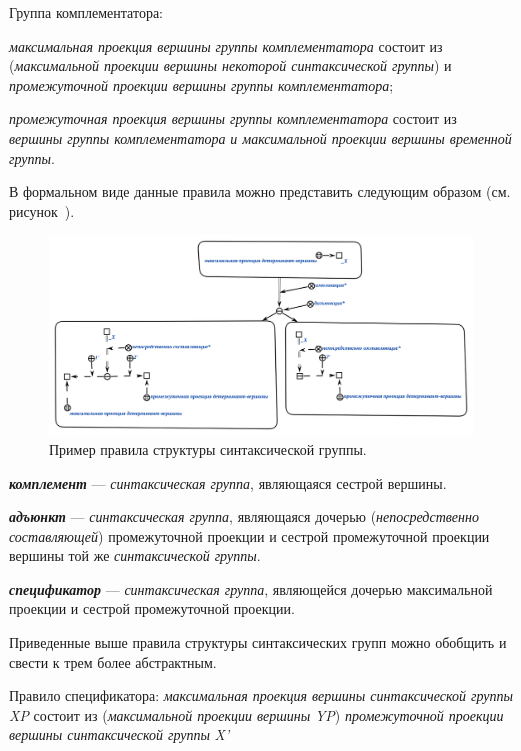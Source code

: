 Группа комплементатора:
\begin{textitemize}
    \item \textit{максимальная проекция вершины группы комплементатора} состоит из (\textit{максимальной проекции вершины некоторой синтаксической группы}) и \textit{промежуточной проекции вершины группы комплементатора};
    \item \textit{промежуточная проекция вершины группы комплементатора} состоит из \textit{вершины группы комплементатора} \textit{и максимальной проекции вершины временной группы}.
\end{textitemize}

В формальном виде данные правила можно представить следующим образом (см.
рисунок~\textit{}).

\begin{figure}[h]
    \centering
    \includegraphics[scale=0.8]{images/part2/chapter_lang/tree_structure_rule}
    \caption{Пример правила структуры синтаксической группы.}
    \label{fig:pic_tree_structure_rule}
\end{figure}

\textbf{\textit{комплемент}} --- \textit{синтаксическая группа}, являющаяся сестрой вершины.

\textbf{\textit{адъюнкт}} --- \textit{синтаксическая группа}, являющаяся дочерью (\textit{непосредственно составляющей}) промежуточной проекции и сестрой промежуточной проекции вершины той же \textit{синтаксической группы}.

\textbf{\textit{спецификатор}} --- \textit{синтаксическая группа}, являющейся дочерью максимальной проекции и сестрой промежуточной проекции.

Приведенные выше правила структуры синтаксических групп можно обобщить и свести к трем более абстрактным.

Правило спецификатора: \textit{максимальная проекция вершины синтаксической группы} \textit{XP} состоит из (\textit{максимальной проекции вершины} \textit{YP}) \textit{промежуточной проекции вершины синтаксической группы} \textit{X'}

